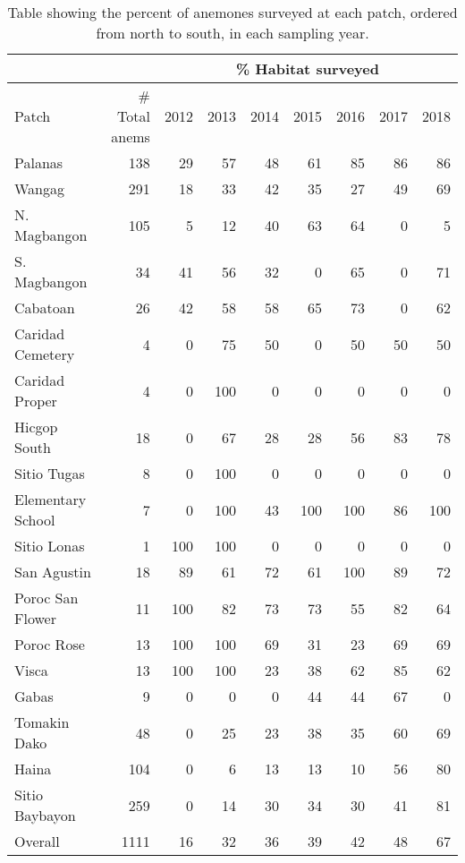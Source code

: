\documentclass[12pt, oneside]{article}   	%
\begin{document}
\begin{table}[!htbp]
\caption{Table showing the percent of anemones surveyed at each patch, ordered from north to south, in each sampling year.} \label{APP_TAB_PercHabSampled}
\begin{centering}
\begin{tabular}{|l|r|r|r|r|r|r|r|r|}
\hline 
\multicolumn{2}{|c|}{} & \multicolumn{7}{|c|}{\% Habitat surveyed} \\ \hline
Patch & \# Total anems & 2012 & 2013 & 2014 & 2015 & 2016 & 2017 & 2018 \\ \hline
Palanas & 138 & 29 & 57 & 48 & 61 & 85 & 86 & 86 \\ \hline 
Wangag & 291 & 18 & 33 & 42 & 35 & 27 & 49 & 69 \\ \hline 
N. Magbangon & 105 & 5 & 12 & 40 & 63 & 64 & 0 & 5 \\ \hline
S. Magbangon & 34 & 41 & 56 & 32 & 0 & 65 & 0 & 71 \\ \hline
Cabatoan & 26 & 42 & 58 & 58 & 65 & 73 & 0 & 62 \\ \hline
Caridad Cemetery & 4 & 0 & 75 & 50 & 0 & 50 & 50 & 50 \\ \hline
Caridad Proper & 4 & 0 & 100 & 0 & 0 & 0 & 0 & 0 \\ \hline  
Hicgop South & 18 & 0 & 67 & 28 & 28 & 56 & 83 & 78 \\ \hline
Sitio Tugas & 8 & 0 & 100 & 0 & 0 & 0 & 0 & 0 \\ \hline 
Elementary School & 7 & 0 & 100 & 43 & 100 & 100 & 86 & 100 \\ \hline  
Sitio Lonas & 1 & 100 & 100 & 0 & 0 & 0 & 0 & 0 \\ \hline  
San Agustin & 18 & 89 & 61 & 72 & 61 & 100 & 89 & 72 \\ \hline  
Poroc San Flower & 11 & 100 & 82 & 73 & 73 & 55 & 82 & 64 \\ \hline
Poroc Rose & 13 & 100 & 100 & 69 & 31 & 23 & 69 & 69 \\ \hline
Visca & 13 & 100 & 100 & 23 & 38 & 62 & 85 & 62 \\ \hline
Gabas & 9 & 0 & 0 & 0 & 44 & 44 & 67 & 0 \\ \hline
Tomakin Dako & 48 & 0 & 25 & 23 & 38 & 35 & 60 & 69 \\ \hline  
Haina & 104 & 0 & 6 & 13 & 13 & 10 & 56 & 80 \\ \hline
Sitio Baybayon & 259 & 0 & 14 & 30 & 34 & 30 & 41 & 81 \\ \hline  
Overall & 1111 & 16 & 32 & 36 & 39 & 42 & 48 & 67 \\ \hline
\end{tabular}
\end{centering}
\end{table}
\end{document}
